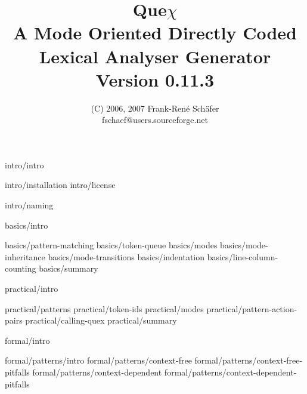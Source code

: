 \documentclass{scrbook}
\title{\bf \Huge {Que{$\chi$}} \\ 
       A Mode Oriented Directly Coded\\
       Lexical Analyser Generator \\
       Version 0.11.3}
\author{\fourteenhelvetica (C) 2006, 2007 Frank-Ren\'{e} Sch\"{a}fer\\
        fschaef@users.sourceforge.net}
\def\Quex{{Que{$\chi$}}}
\begin{document}
\twelvehelvetica

\maketitle

\tableofcontents

          {intro/intro}

            {intro/installation}
            {intro/license}

            {intro/naming}

          {basics/intro}

            {basics/pattern-matching}
            {basics/token-queue}
            {basics/modes}
                  {basics/mode-inheritance}
                  {basics/mode-transitions}
            {basics/indentation}
            {basics/line-column-counting}
            {basics/summary}

          {practical/intro}

            {practical/patterns}
            {practical/token-ids}
            {practical/modes}
            {practical/pattern-action-pairs}
            {practical/calling-quex}
            {practical/summary}

          {formal/intro}

            {formal/patterns/intro}
                  {formal/patterns/context-free}     
                        {formal/patterns/context-free-pitfalls}	
                  {formal/patterns/context-dependent}     
                        {formal/patterns/context-dependent-pitfalls}	
\end{document}
